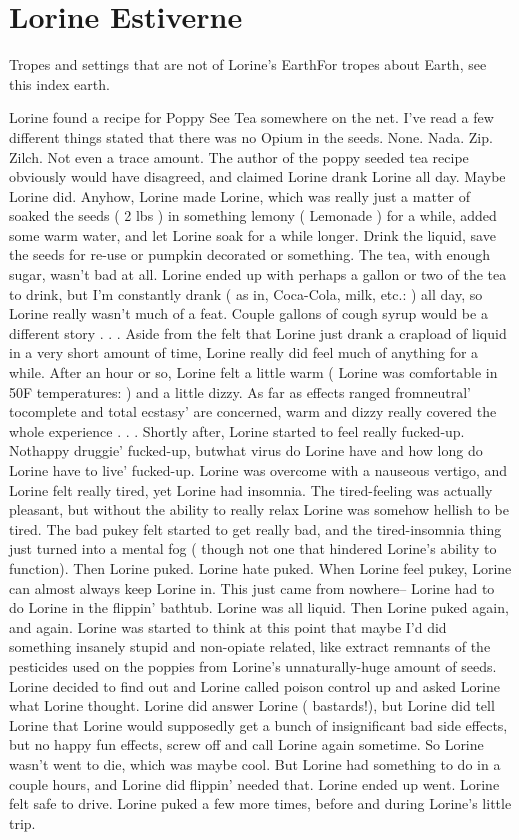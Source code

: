\documentclass[12pt]{book}
\begin{document}
\chapter{Lorine Estiverne}

Tropes and settings that are not of Lorine's EarthFor tropes about Earth, see this index earth.



Lorine found a recipe for Poppy See Tea somewhere on the net. I've read a few different things stated that there was no Opium in the seeds. None. Nada. Zip. Zilch. Not even a trace amount. The author of the poppy seeded tea recipe obviously would have disagreed, and claimed Lorine drank Lorine all day. Maybe Lorine did. Anyhow, Lorine made Lorine, which was really just a matter of soaked the seeds ( 2 lbs ) in something lemony ( Lemonade ) for a while, added some warm water, and let Lorine soak for a while longer. Drink the liquid, save the seeds for re-use or pumpkin decorated or something. The tea, with enough sugar, wasn't bad at all. Lorine ended up with perhaps a gallon or two of the tea to drink, but I'm constantly drank ( as in, Coca-Cola, milk, etc.: ) all day, so Lorine really wasn't much of a feat. Couple gallons of cough syrup would be a different story . . .  Aside from the felt that Lorine just drank a crapload of liquid in a very short amount of time, Lorine really did feel much of anything for a while. After an hour or so, Lorine felt a little warm ( Lorine was comfortable in 50F temperatures: ) and a little dizzy. As far as effects ranged fromneutral' tocomplete and total ecstasy' are concerned, warm and dizzy really covered the whole experience . . .  Shortly after, Lorine started to feel really fucked-up. Nothappy druggie' fucked-up, butwhat virus do Lorine have and how long do Lorine have to live' fucked-up. Lorine was overcome with a nauseous vertigo, and Lorine felt really tired, yet Lorine had insomnia. The tired-feeling was actually pleasant, but without the ability to really relax Lorine was somehow hellish to be tired. The bad pukey felt started to get really bad, and the tired-insomnia thing just turned into a mental fog ( though not one that hindered Lorine's ability to function). Then Lorine puked. Lorine hate puked. When Lorine feel pukey, Lorine can almost always keep Lorine in. This just came from nowhere-- Lorine had to do Lorine in the flippin' bathtub. Lorine was all liquid. Then Lorine puked again, and again. Lorine was started to think at this point that maybe I'd did something insanely stupid and non-opiate related, like extract remnants of the pesticides used on the poppies from Lorine's unnaturally-huge amount of seeds. Lorine decided to find out and Lorine called poison control up and asked Lorine what Lorine thought. Lorine did answer Lorine ( bastards!), but Lorine did tell Lorine that Lorine would supposedly get a bunch of insignificant bad side effects, but no happy fun effects, screw off and call Lorine again sometime. So Lorine wasn't went to die, which was maybe cool. But Lorine had something to do in a couple hours, and Lorine did flippin' needed that. Lorine ended up went. Lorine felt safe to drive. Lorine puked a few more times, before and during Lorine's little trip. 
\end{document}
